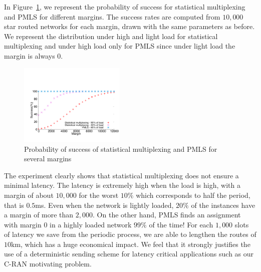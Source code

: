 \documentclass[10pt, conference, letterpaper]{IEEEtran}
\begin{document}
     In Figure~\ref{fig:sto}, we represent the probability of success for 
     statistical multiplexing and PMLS for different margins. The success rates are computed from $10,000$ star routed networks for each margin, drawn with the same parameters as before. We represent the distribution under high and light load for statistical multiplexing and under high load only for PMLS since under light load the margin is always $0$. 
     

    \begin{figure}
       \begin{center}
      \includegraphics[width = 0.45\textwidth]{stochastic.pdf}
      \end{center}
      \caption{Probability of success of statistical multiplexing and PMLS for several margins}
      \label{fig:sto}   
     \end{figure}    
     
     The experiment clearly shows that statistical multiplexing does not ensure a minimal latency. 
     The latency is extremely high when the load is high, with a margin of about $10,000$ for the worst $10\%$ which corresponds to half the period, that is $0.5$ms. Even when the network is lightly loaded, $20\%$ of the instances have a margin of more than $2,000$. On the other hand, PMLS finds an assignment with margin $0$ in a highly loaded network $99\%$ of the time! 
     For each $1,000$ slots of latency we save from the periodic process, we are able to lengthen the routes of $10$km, which has a huge economical impact. We feel that it strongly justifies the use of a deterministic sending scheme for latency critical applications such as our C-RAN motivating problem.     
     
\end{document}

